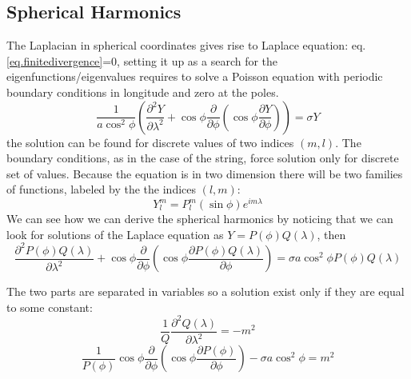  

\subsection{Spherical Harmonics}
The Laplacian in spherical coordinates gives rise to Laplace equation: eq.\ref{eq.finitedivergence}=0, setting it up as a search for the eigenfunctions/eigenvalues requires to solve a Poisson equation with periodic boundary conditions in longitude and zero at the poles. 
\begin{equation}\label{eq.sphericalhar}
    \frac{1}{a\cos^2\phi}\left(\frac{\partial^2Y}{\partial\lambda^2}+\cos\phi\frac{\partial}{\partial\phi}\left(\cos\phi\frac{\partial Y}{\partial\phi}\right)\right)=\sigma Y
\end{equation}
the solution can be found for discrete values of two indices $(m,l)$. 
The boundary conditions, as in the case of the string, force solution only for
discrete set of values. Because the equation is in two dimension there will
be two families of functions, labeled by the the indices $(l,m)$:
\begin{equation}
    Y_l^m=P_l^m(\sin\phi)e^{im\lambda}
\end{equation}
We can see how we can derive the spherical harmonics by noticing that we can look for solutions of the Laplace equation as $Y=P(\phi)Q(\lambda)$, then
$$\frac{\partial^2P(\phi)Q(\lambda)}{\partial\lambda^2}+\cos\phi\frac{\partial}{\partial\phi}\left(\cos\phi\frac{\partial P(\phi)Q(\lambda)}{\partial\phi}\right)=\sigma a\cos^2\phi P(\phi)Q(\lambda)$$


The two parts are separated in variables so a solution exist
only if they are equal to some constant:
$$\frac{1}{Q}\frac{\partial^2Q(\lambda)}{\partial\lambda^2}=-m^2$$
$$\frac{1}{P(\phi)}\cos\phi\frac{\partial}{\partial\phi}\left(\cos\phi\frac{\partial P(\phi)}{\partial\phi}\right)-\sigma a\cos^2\phi=m^2$$

